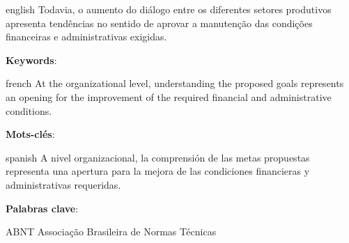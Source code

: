 \documentclass[
	12pt,				%
	oneside,			%
	a4paper,			%
	english,			%
	french,				%
	spanish,			%
	brazil				%
	]{abntex2}
\newcommand{\listasdousuario}{}
\begin{document}

\begin{resumo}[Abstract]
 \begin{otherlanguage*}{english}
   Todavia, o aumento do diálogo entre os diferentes setores produtivos
   apresenta tendências no sentido de aprovar a manutenção das condições
   financeiras e administrativas exigidas.

   \vspace{\onelineskip}
 
   \noindent 
   \textbf{Keywords}: 
 \end{otherlanguage*}
\end{resumo}

\begin{resumo}[Résumé]
 \begin{otherlanguage*}{french}
    At the organizational level, understanding the proposed goals represents
    an opening for the improvement of the required financial and
    administrative conditions.
 
   \textbf{Mots-clés}: 
 \end{otherlanguage*}
\end{resumo}

\begin{resumo}[Resumen]
 \begin{otherlanguage*}{spanish}
   A nivel organizacional, la comprensión de las metas propuestas
   representa una apertura para la mejora de las condiciones financieras y
   administrativas requeridas.
  
   \textbf{Palabras clave}: 
 \end{otherlanguage*}
\end{resumo}




\listasdousuario

\begin{siglas}
  \item[ABNT] Associação Brasileira de Normas Técnicas
\end{siglas}

\tableofcontents*
\cleardoublepage
\end{document}
